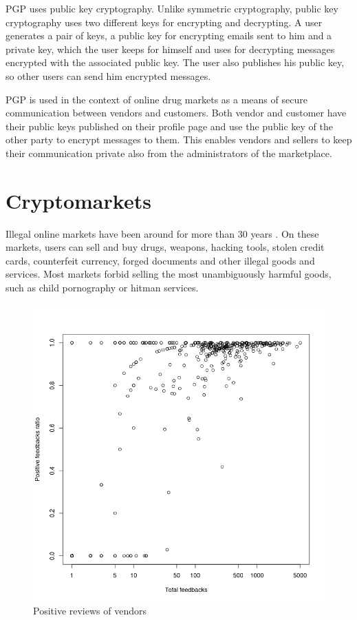 \documentclass[
  digital, %
  table,   %
  lof,     %
  lot,     %
  oneside
]{fithesis3}
\begin{document}
PGP uses public key cryptography. Unlike symmetric cryptography, public key cryptography
uses two different keys for encrypting and decrypting.
A user generates a pair of keys, a public key for encrypting emails sent to him and a private key, which the user
 keeps for himself and uses for decrypting messages encrypted with the associated public key.
 The user also publishes his public key, so other users can send him encrypted messages.

PGP is used in the context of online drug markets as a means of secure communication between vendors and customers.
Both vendor and customer have their public keys published on their profile page and use the public key of the other
party to encrypt messages to them. This enables vendors and sellers to keep their communication private also from the administrators of the marketplace.

\section{Cryptomarkets}

Illegal online markets have been around for more than 30 years \parencite{motoyama2011analysis}.
On these markets, users can sell and buy drugs, weapons, hacking tools, stolen credit cards,
counterfeit currency, forged documents and other illegal goods and services.
Most markets forbid selling the most unambiguously harmful goods, such as child pornography or hitman services.
 \begin{figure}[!htb]
    \centering
    \includegraphics[scale=0.4]{posratxtotal}
    \caption{Positive reviews of vendors}
    \label{posratxtotal}
\end{figure}
\end{document}
